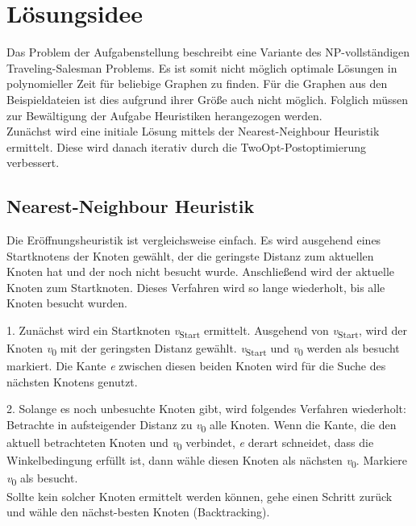 \maketitle
\tableofcontents

\vspace{0.5cm}


\section{Lösungsidee}\label{sec:losungsidee}
Das Problem der Aufgabenstellung beschreibt eine Variante des NP-vollständigen Traveling-Salesman Problems.
Es ist somit nicht möglich optimale Lösungen in polynomieller Zeit für beliebige Graphen zu finden.
Für die Graphen aus den Beispieldateien ist dies aufgrund ihrer Grö{\ss}e auch nicht möglich.
Folglich müssen zur Bewältigung der Aufgabe Heuristiken herangezogen werden. \\
Zunächst wird eine initiale Lösung mittels der Nearest-Neighbour Heuristik ermittelt.
Diese wird danach iterativ durch die TwoOpt-Postoptimierung verbessert.

\subsection{Nearest-Neighbour Heuristik}\label{subsec:nearest-neighbour-heuristik}
Die Eröffnungsheuristik ist vergleichsweise einfach.
Es wird ausgehend eines Startknotens der Knoten gewählt, der die
geringste Distanz zum aktuellen Knoten hat und der noch nicht besucht wurde.
Anschlie{\ss}end wird der aktuelle Knoten zum Startknoten.
Dieses Verfahren wird so lange wiederholt, bis alle Knoten besucht wurden.

1.
Zunächst wird ein Startknoten \textit{v}\textsubscript{Start} ermittelt.
Ausgehend von \textit{v}\textsubscript{Start}, wird der Knoten \textit{v}\textsubscript{0} mit der geringsten Distanz gewählt.
\textit{v}\textsubscript{Start} und \textit{v}\textsubscript{0} werden als besucht markiert.
Die Kante \textit{e} zwischen diesen beiden Knoten wird für die Suche des nächsten Knotens genutzt.

2.
Solange es noch unbesuchte Knoten gibt, wird folgendes Verfahren wiederholt:
Betrachte in aufsteigender Distanz zu \textit{v}\textsubscript{0} alle Knoten.
Wenn die Kante, die den aktuell betrachteten Knoten und \textit{v}\textsubscript{0} verbindet, \textit{e}
derart schneidet, dass die Winkelbedingung erfüllt ist, dann wähle diesen Knoten als nächsten \textit{v}\textsubscript{0}.
Markiere \textit{v}\textsubscript{0} als besucht. \\
Sollte kein solcher Knoten ermittelt werden können, gehe einen Schritt zurück und wähle den nächst-besten Knoten (Backtracking).


